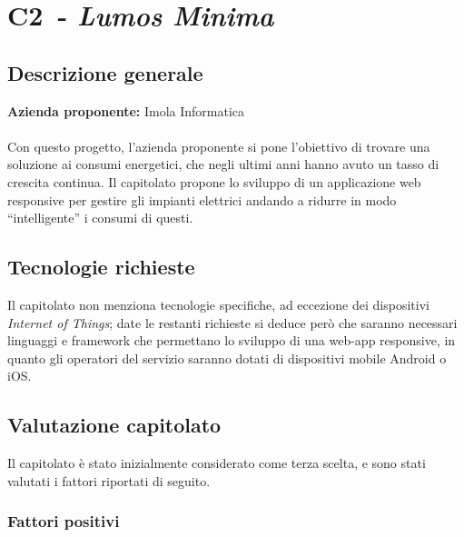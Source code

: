 
\renewcommand{\capName}{\textit{Lumos Minima}} %
\renewcommand{\capCode}{C2} %
\renewcommand{\capLink}{https://www.math.unipd.it/~tullio/IS-1/2022/Progetto/C2.pdf} %
\renewcommand{\capProposer}{ImolaInformatica} %


\section{\capCode\ - \capName}
\subsection{Descrizione generale}
\textbf{Azienda proponente:} Imola Informatica\\
\\
Con questo progetto, l'azienda proponente si pone l'obiettivo di trovare una soluzione ai consumi energetici, che negli ultimi anni hanno avuto un tasso di crescita continua. Il capitolato propone lo sviluppo di un applicazione web responsive per gestire gli impianti elettrici andando a ridurre in modo “intelligente” i consumi di questi.
\subsection{Tecnologie richieste}
Il capitolato non menziona tecnologie specifiche, ad eccezione dei dispositivi \textit{Internet of Things}; date le restanti richieste si deduce però che saranno necessari linguaggi e framework che permettano lo sviluppo di una web-app responsive, in quanto gli operatori del servizio saranno dotati di dispositivi mobile Android o iOS.

\subsection{Valutazione capitolato}
Il capitolato è stato inizialmente considerato come terza scelta, e sono stati valutati i fattori riportati di seguito.

\subsubsection{Fattori positivi}

